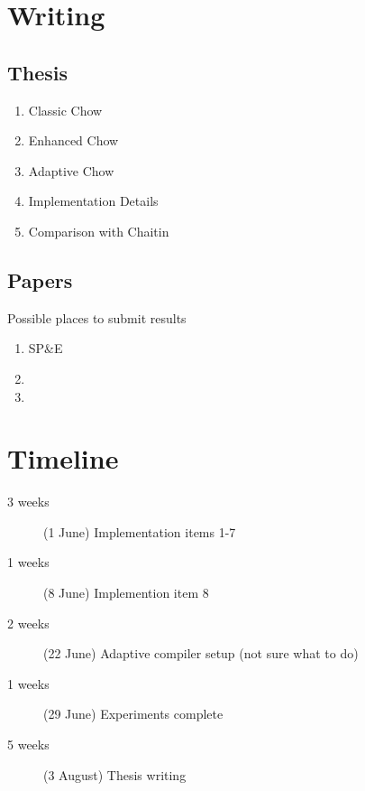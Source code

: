 \documentclass[11pt]{article}
\begin{document}
\section{Writing}
\subsection{Thesis}
\begin{enumerate}
\item Classic Chow
\item Enhanced Chow
\item Adaptive Chow
\item Implementation Details
\item Comparison with Chaitin
\end{enumerate}

\subsection{Papers}
Possible places to submit results
\begin{enumerate}
\item SP\&E
\item
\item
\end{enumerate}

\section{Timeline}
\begin{description}
\item[3 weeks] (1 June)  Implementation items 1-7
\item[1 weeks] (8 June)  Implemention item 8
\item[2 weeks] (22 June) Adaptive compiler setup (not sure what to do)
\item[1 weeks] (29 June) Experiments complete
\item[5 weeks] (3 August) Thesis writing
\end{description}
\end{document}
